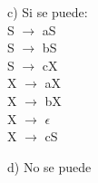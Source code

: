 \begin{center}
	c) Si se puede: \\
	S $\rightarrow$ aS \\
	S $\rightarrow$ bS \\
	S $\rightarrow$ cX\\
	X $\rightarrow$ aX\\
	X $\rightarrow$ bX\\
	X $\rightarrow$ $\epsilon$ \\
	X $\rightarrow$ cS \\
\end{center}

\begin{center}
	d) No se puede \\
	
\end{center}








